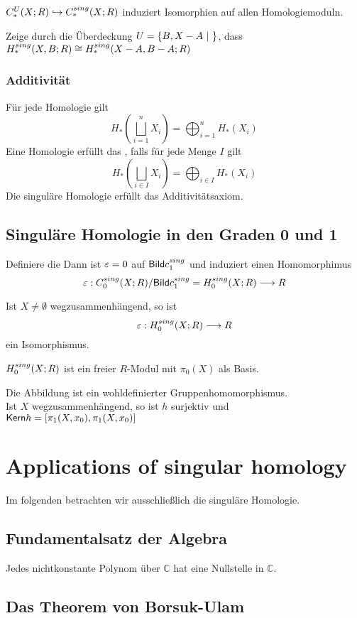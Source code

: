 $C^U_*(X;R) \overset{}{\hookrightarrow} C^{sing}_{*}(X;R)$ induziert Isomorphien auf allen Homologiemoduln.

Zeige durch die Überdeckung $U = \left\lbrace B, X - A~|~ \right\rbrace$, dass $H^{sing}_{*}(X, B; R) \cong H^{sing}_{*}(X - A, B - A; R)$

\subsection{Additivität}
Für jede Homologie gilt
\[H_*(\bigsqcup^n_{i= 1} X_i ) = \bigoplus_{i=1}^nH_*(X_i) \]
\Def{}
Eine Homologie erfüllt das , falls für jede Menge $I$ gilt
\[H_*(\bigsqcup_{i\in I} X_i ) = \bigoplus_{i\in I}H_*(X_i) \]
Die singuläre Homologie erfüllt das Additivitätsaxiom.

\section{Singuläre Homologie in den Graden 0 und 1}
\Def{}
Definiere die 
Dann ist $\varepsilon = 0$ auf $\textsf{Bild} c^{sing}_{1}$ und induziert einen Homomorphimus
\[ \varepsilon : C^{sing}_{0}(X;R)/\textsf{Bild} c^{sing}_{1} = H^{sing}_{0}(X;R) \overset{}{\longrightarrow} R  \]

\Satz{}
Ist $X \neq \emptyset$ wegzusammenhängend, so ist 
\[ \varepsilon :  H^{sing}_{0}(X;R) \overset{}{\longrightarrow} R  \]
ein Isomorphismus.

\Kor{}
$H^{sing}_{0}(X;R)$ ist ein freier $R$-Modul mit $\pi_0(X)$ als Basis.

Die Abbildung
ist ein wohldefinierter Gruppenhomomorphismus.\\
Ist $X$ wegzusammenhängend, so ist $h$ surjektiv und $\textsf{Kern} h = [\pi_1(X,x_0),\pi_1(X,x_0)]$

\chapter{Applications of singular homology}
Im folgenden betrachten wir ausschließlich die singuläre Homologie.

\section{Fundamentalsatz der Algebra}

Jedes nichtkonstante Polynom über $\mathbb{C}$ hat eine Nullstelle in $\mathbb{C}$.

\section{Das Theorem von Borsuk-Ulam}

